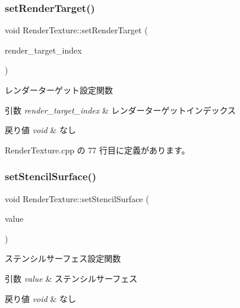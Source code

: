 \subsubsection{\texorpdfstring{set\+Render\+Target()}{setRenderTarget()}}
{\footnotesize\ttfamily void Render\+Texture\+::set\+Render\+Target (\begin{DoxyParamCaption}\item[{int}]{render\+\_\+target\+\_\+index }\end{DoxyParamCaption})}



レンダーターゲット設定関数 


\begin{DoxyParams}{引数}
{\em render\+\_\+target\+\_\+index} & レンダーターゲットインデックス \\
\hline
\end{DoxyParams}

\begin{DoxyRetVals}{戻り値}
{\em void} & なし \\
\hline
\end{DoxyRetVals}


 Render\+Texture.\+cpp の 77 行目に定義があります。

\mbox{\label{class_render_texture_a90dc1e935f2d501b7464530b9ab913c0}} 
\subsubsection{\texorpdfstring{set\+Stencil\+Surface()}{setStencilSurface()}}
{\footnotesize\ttfamily void Render\+Texture\+::set\+Stencil\+Surface (\begin{DoxyParamCaption}\item[{L\+P\+D\+I\+R\+E\+C\+T3\+D\+S\+U\+R\+F\+A\+C\+E9}]{value }\end{DoxyParamCaption})}



ステンシルサーフェス設定関数 


\begin{DoxyParams}{引数}
{\em value} & ステンシルサーフェス \\
\hline
\end{DoxyParams}

\begin{DoxyRetVals}{戻り値}
{\em void} & なし \\
\hline
\end{DoxyRetVals}


